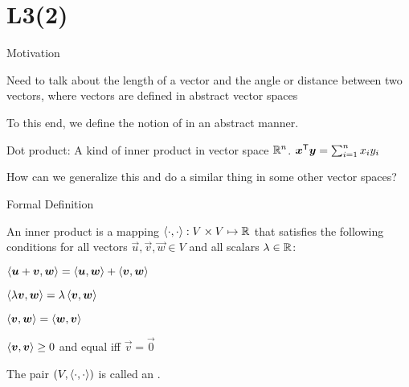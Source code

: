\documentclass[handout,fleqn,aspectratio=169]{beamer}
\begin{document}
\section{L3(2)}
\begin{frame}{Motivation}

\plitemsep 0.1in

\bci 
\item Need to talk about the length of a vector and the angle or distance between two vectors, where vectors are defined in abstract vector spaces

\item To this end, we define the notion of  in an abstract manner.

\item Dot product: A kind of inner product in vector space ${\mathbb R}^n$. ${\bm{x}}^{\mathsf{T}} \bm{y} = \sum_{i=1}^n x_i y_i$ 


\bigskip
\item \question How can we generalize this and do a similar thing in some other vector spaces?
\eci
\end{frame}

\begin{frame}{Formal Definition}

\plitemsep 0.1in

\bci 
\item An inner product is a mapping $\left\langle \cdot, \cdot \right\rangle: V \times V \mapsto {\mathbb R}$ that satisfies the following conditions for all vectors $\vec{u},\vec{v},\vec{w} \in V$ and all scalars $\lambda \in {\mathbb R}$:

\medskip
\bce
\item $\left\langle \bm{u}+ \bm{v}, \bm{w} \right\rangle = \left\langle \bm{u}, \bm{w} \right\rangle + \left\langle \bm{v}, \bm{w} \right\rangle$
\item $\left\langle \lambda \bm{v}, \bm{w} \right\rangle = \lambda \left\langle \bm{v}, \bm{w} \right\rangle$
\item $\left\langle \bm{v}, \bm{w} \right\rangle = \left\langle \bm{w}, \bm{v} \right\rangle$
\item $\left\langle \bm{v}, \bm{v} \right\rangle \ge 0$ and equal iff $\vec{v}=\vec{0}$
\ece
\medskip

\item The pair $(V,\left\langle \cdot, \cdot \right\rangle)$ is called an .

\eci
\end{frame}
\end{document}
